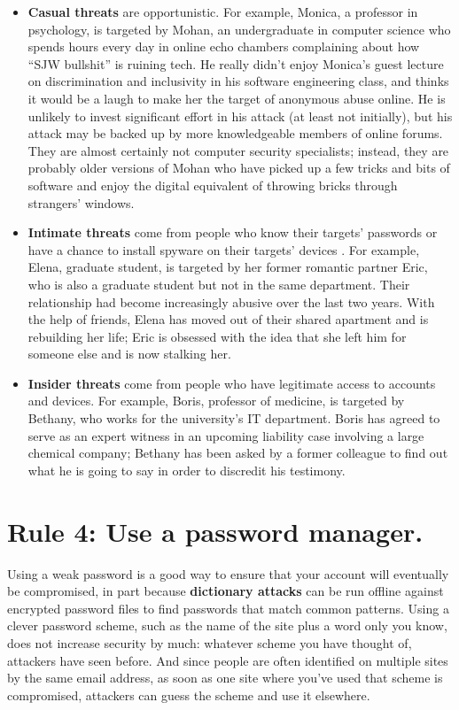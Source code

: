 \documentclass[10pt,letterpaper]{article}
\begin{document}
\begin{itemize}
\item
  \textbf{Casual threats} are opportunistic. For example, Monica, a professor in
  psychology, is targeted by Mohan, an undergraduate in computer science who
  spends hours every day in online echo chambers complaining about how ``SJW
  bullshit'' is ruining tech. He really didn't enjoy Monica's guest lecture on
  discrimination and inclusivity in his software engineering class, and thinks
  it would be a laugh to make her the target of anonymous abuse online. He is
  unlikely to invest significant effort in his attack (at least not initially),
  but his attack may be backed up by more knowledgeable members of online
  forums. They are almost certainly not computer security specialists; instead,
  they are probably older versions of Mohan who have picked up a few tricks and
  bits of software and enjoy the digital equivalent of throwing bricks through
  strangers' windows.

\item
  \textbf{Intimate threats} come from people who know their targets' passwords
  or have a chance to install spyware on their targets' devices \cite{Leit2019}.
  For example, Elena, graduate student, is targeted by her former romantic
  partner Eric, who is also a graduate student but not in the same department.
  Their relationship had become increasingly abusive over the last two years.
  With the help of friends, Elena has moved out of their shared apartment and is
  rebuilding her life; Eric is obsessed with the idea that she left him for
  someone else and is now stalking her.

\item
  \textbf{Insider threats} come from people who have legitimate access to
  accounts and devices. For example, Boris, professor of medicine, is targeted
  by Bethany, who works for the university's IT department.  Boris has agreed to
  serve as an expert witness in an upcoming liability case involving a large
  chemical company; Bethany has been asked by a former colleague to find out
  what he is going to say in order to discredit his testimony.
\end{itemize}

\section*{Rule 4: Use a password manager.}

Using a weak password is a good way to ensure that your account will eventually
be compromised, in part because \textbf{dictionary attacks} can be run offline
against encrypted password files to find passwords that match common
patterns. Using a clever password scheme, such as the name of the site plus a
word only you know, does not increase security by much: whatever scheme you have
thought of, attackers have seen before. And since people are often identified on
multiple sites by the same email address, as soon as one site where you've used
that scheme is compromised, attackers can guess the scheme and use it elsewhere.
\end{document}

